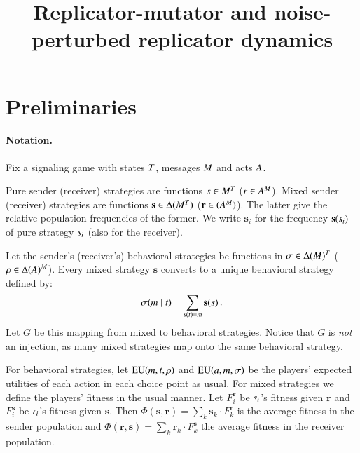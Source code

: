 \documentclass[fleqn,reqno,10pt]{article}
\title{Replicator-mutator and noise-perturbed replicator dynamics}
\author{}
\date{}
\renewcommand{\Smixed}{\ensuremath{\mathrm{\mathbf{s}}}}
\renewcommand{\Rmixed}{\ensuremath{\mathrm{\mathbf{r}}}}
\begin{document}
\maketitle


\section{Preliminaries}

\paragraph{Notation.} Fix a signaling game with states $T$,
messages $M$ and acts $A$. %

Pure sender (receiver) strategies are functions $s \in
M^T$ ($r \in A^M$). Mixed sender (receiver)
strategies are functions $\Smixed \in \Delta(\Messgs^\States)$
($\Rmixed \in (\Acts^\Messgs)$). The latter give the relative
population frequencies of the former. We write $\Smixed_i$ for the
frequency $\Smixed(\Spure_i)$ of pure strategy $s_i$ (also for
the receiver).



Let the sender's (receiver's) behavioral strategies be functions in
$\sigma \in \Delta(M)^T$ ($\rho \in
\Delta(A)^M$). Every mixed strategy $\Smixed$ converts to a
unique behavioral strategy defined by:
\begin{align*}
  \Sstrat(\messg \probbar \state) = \sum_{\Spure(\state) = \messg} \Smixed(\Spure)\,.
\end{align*} 
Let $G$ be this mapping from mixed to behavioral strategies. Notice
that $G$ is \emph{not} an injection, as many mixed strategies map onto
the same behavioral strategy.

For behavioral strategies, let $\mathrm{EU}(m, t, \rho)$ and
$\mathrm{EU}(a, m, \sigma)$ be the players' expected utilities of
each action in each choice point as usual. For mixed strategies we
define the players' fitness in the usual manner. Let $F_i^{\Rmixed}$
be $s_i$'s fitness given $\Rmixed$ and $F_i^{\Smixed}$ be
$r_i$'s fitness given $\Smixed$. Then $\Phi(\Smixed,\Rmixed) =
\sum_{k} \Smixed_k \cdot F_k^{\Rmixed}$ is the average fitness in the
sender population and $\Phi(\Rmixed,\Smixed) = \sum_{k} \Rmixed_k
\cdot F_k^{\Smixed}$ the average fitness in the receiver population.
\end{document}
